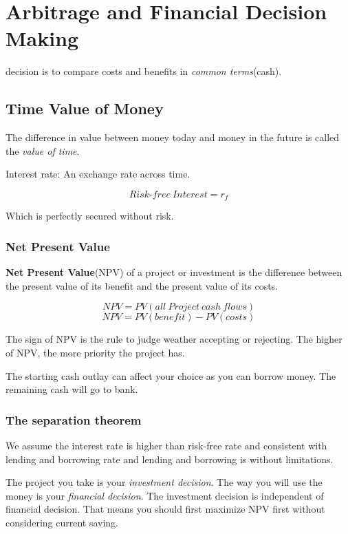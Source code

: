 \documentclass[10pt, a4paper]{article}
\begin{document}
    \section{Arbitrage and Financial Decision Making}
        decision is to compare costs and benefits in \emph{common terms}(cash).
        \subsection{Time Value of Money}
            The difference in value between money today and money in the future is called the \emph{value of time}.

            Interest rate: An exchange rate across time. 
            
            $$Risk\text{-}free\ Interest = r_f$$

            Which is perfectly secured without risk.  
            
            \subsubsection{Net Present Value}
                \textbf{Net Present Value}(NPV) of a project or investment is the difference between the present value of its benefit and the present value of its costs. 

                $$NPV = PV (all\ Project\ cash\ flows)$$
                $$NPV = PV(benefit) - PV(costs)$$
            
                The sign of NPV is the rule to judge weather accepting or rejecting. The higher of NPV, the more priority the project has. 

                The starting cash outlay can affect your choice as you can borrow money. The remaining cash will go  to bank. 
            
            \subsubsection{The separation theorem }
                We assume the interest rate is higher than risk-free rate and consistent with lending and borrowing rate and lending and borrowing is without limitations. 

                The project you take is your \emph{investment decision}. The way you will use the money is your \emph{financial decision}. The investment decision is independent of financial decision. That means you should first maximize NPV first without considering current saving. 
\end{document}
